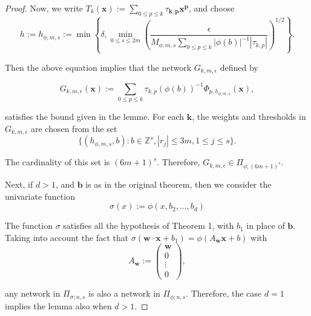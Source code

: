 \documentclass[11pt,a4paper]{article}
\theoremstyle{plain}
\theoremstyle{definition}
\theoremstyle{remark}
\begin{document}
\begin{proof}
Now, we write \( T_k(\mathbf{x}) := \sum_{0\leq p \leq k} \tau_{ \mathbf{k},\mathbf{p} } \mathbf{x}^{\mathbf{p}} \), and choose
\begin{equation}
    h := h_{\phi,m,s} := \min \left\{ \delta, \min_{0\leq s \leq 2m} \left( \frac{\epsilon}{M_{\phi,m,s} \sum_{0 \leq p \leq k} |\phi(b)|^{-1} |\tau_{k,p}|} \right)^{1/2} \right\}.
\end{equation}

Then the above equation implies that the network \( G_{k,m,\epsilon} \) defined by

\begin{equation}
    G_{k,m,\epsilon}(\mathbf{x}) := \sum_{0 \leq p \leq k} \tau_{k,p}(\phi(b))^{-1} \Phi_{p,h_{\phi,m,s}}(\mathbf{x}),
\end{equation}

satisfies the bound given in the lemme. For each \( \mathbf{k} \), the weights and thresholds in \( G_{k,m,\epsilon} \) are chosen from the set
\begin{equation}
    \{ (h_{\phi,m,s}, b) : b \in \mathbb{Z}^s, |r_{j}| \leq 3m, 1 \leq j \leq s \}.
\end{equation}

The cardinality of this set is \( (6m + 1)^s \). Therefore, \( G_{k,m,\epsilon} \in \Pi_{\phi;(6m+1)^s} \).

Next, if \(d >1\), and \(\mathbf{b}\) is as in the original theorem, then we consider the univariate function
\begin{equation}
    \sigma (x) := \phi (x, b_2, \ldots, b_d)
\end{equation}

The function \( \sigma \) satisfies all the hypothesis of Theorem 1, with \( b_1 \) in place of \( \mathbf{b}  \). Taking into account the fact that \( \sigma(\mathbf{w} \cdot \mathbf{x} + b_1) = \phi(A_{\mathbf{w}}\mathbf{x} + b) \) with
\begin{equation}
    A_{\mathbf{w}} := \begin{pmatrix}
        \mathbf{w} \\
        0 \\
        \vdots \\
        0
    \end{pmatrix},
\end{equation}

any network in \( \Pi_{\sigma;n,s} \) is also a network in \( \Pi_{\phi;n,s} \). Therefore, the case \( d = 1 \) implies the lemma also when \( d > 1 \).
\end{proof}
\end{document}
